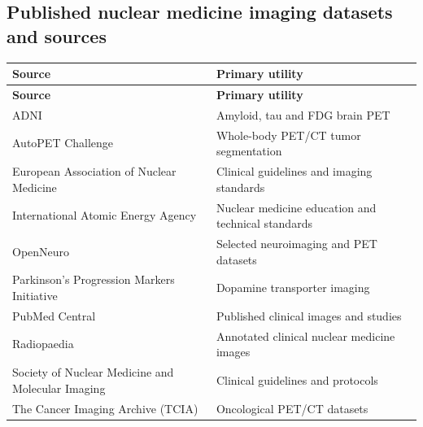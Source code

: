 \subsection{Published nuclear medicine imaging datasets and sources}
\begin{longtable}{@{}p{}p{}@{}}
\toprule
\textbf{Source} & \textbf{Primary utility} \\
\midrule
\endfirsthead
\toprule
\textbf{Source} & \textbf{Primary utility} \\
\midrule
\endhead
ADNI & Amyloid, tau and FDG brain PET \\
AutoPET Challenge & Whole-body PET/CT tumor segmentation \\
European Association of Nuclear Medicine & Clinical guidelines and imaging standards \\
International Atomic Energy Agency & Nuclear medicine education and technical standards \\
OpenNeuro & Selected neuroimaging and PET datasets \\
Parkinson's Progression Markers Initiative & Dopamine transporter imaging \\
PubMed Central & Published clinical images and studies \\
Radiopaedia & Annotated clinical nuclear medicine images \\
Society of Nuclear Medicine and Molecular Imaging & Clinical guidelines and protocols \\
The Cancer Imaging Archive (TCIA) & Oncological PET/CT datasets \\
\bottomrule
\end{longtable}

